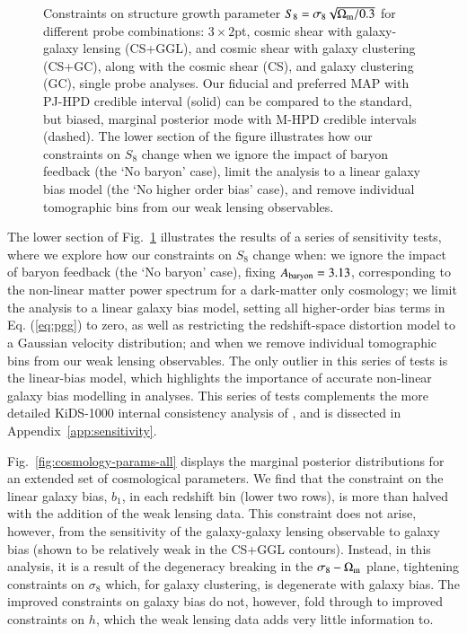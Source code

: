 \begin{figure}
\begin{center}
		\caption{Constraints on structure growth parameter $S_{8} = \sigma_8 \sqrt{\Omega_{\rm m}/0.3}$ for different probe combinations: $3\times2$pt, cosmic shear with galaxy-galaxy lensing (CS+GGL), and cosmic shear with galaxy clustering (CS+GC), along with the cosmic shear (CS), and galaxy clustering (GC), single probe analyses.   Our fiducial and preferred MAP with PJ-HPD credible interval (solid) can be compared to the standard, but biased, marginal posterior mode with M-HPD credible intervals (dashed).   The lower section of the figure illustrates how our constraints on $S_8$ change when we ignore the impact of baryon feedback (the `No baryon' case), limit the analysis to a linear galaxy bias model (the `No higher order bias' case), and remove individual tomographic bins from our weak lensing observables.    
		}
		\label{fig:S8comp}
	\end{center}
\end{figure}

The lower section of Fig.~\ref{fig:S8comp} illustrates the results of a series of sensitivity tests, where we explore how our constraints on $S_8$ change when: 
we ignore the impact of baryon feedback (the `No baryon' case), fixing $A_{\rm baryon}=3.13$, corresponding to the non-linear matter power spectrum for a dark-matter only cosmology; 
we limit the analysis to a linear galaxy bias model, setting all higher-order bias terms in Eq. (\ref{eq:pgg}) to zero, as well as restricting the redshift-space distortion model to a Gaussian velocity distribution; 
and when we remove individual tomographic bins from our weak lensing observables. 
The only outlier in this series of tests is the linear-bias model, which highlights the importance of accurate non-linear galaxy bias modelling in \tttp analyses. 
This series of tests complements the more detailed KiDS-1000 internal consistency analysis of \citet{asgari/etal:inprep}, and is dissected in Appendix~\ref{app:sensitivity}.

Fig.~\ref{fig:cosmology-params-all} displays the marginal posterior distributions for an extended set of cosmological parameters.  
We find that the constraint on the linear galaxy bias,  $b_1$, in each redshift bin (lower two rows), is more than halved with the addition of the weak lensing data. 
This constraint does not arise, however, from the sensitivity of the galaxy-galaxy lensing observable to galaxy bias (shown to be relatively weak in the CS+GGL contours). 
Instead, in this analysis, it is a result of the degeneracy breaking in the $\sigma_8-\Omega_{\rm m}$ plane, tightening constraints on $\sigma_8$ which, for galaxy clustering, is degenerate with galaxy bias. 
The improved constraints on galaxy bias do not, however, fold through to improved constraints on $h$, which the weak lensing data adds very little information to. 

